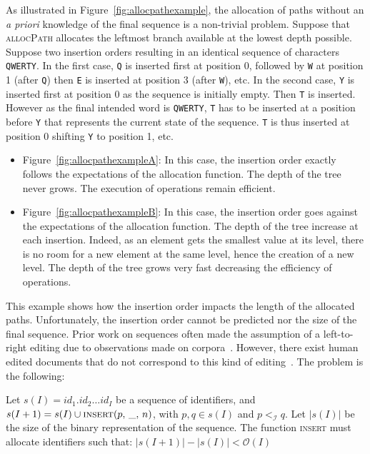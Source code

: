 As illustrated in Figure~\ref{fig:allocpathexample}, the allocation of paths
without an \emph{a priori} knowledge of the final sequence is a non-trivial
problem.  Suppose that \textsc{allocPath} allocates the leftmost branch
available at the lowest depth possible. Suppose two insertion orders resulting
in an identical sequence of characters \texttt{QWERTY}.  In the first case,
\texttt{Q} is inserted first at position 0, followed by \texttt{W} at position 1
(after \texttt{Q}) then \texttt{E} is inserted at position 3 (after \texttt{W}),
etc.  In the second case, \texttt{Y} is inserted first at position 0 as the
sequence is initially empty. Then \texttt{T} is inserted. However as the final
intended word is \texttt{QWERTY}, \texttt{T} has to be inserted at a position
before \texttt{Y} that represents the current state of the sequence. \texttt{T}
is thus inserted at position 0 shifting \texttt{Y} to position 1, etc.


\begin{itemize}
\item Figure~\ref{fig:allocpathexampleA}: In this case, the insertion order
  exactly follows the expectations of the allocation function. The depth of the
  tree never grows. The execution of operations remain efficient.

\item Figure~\ref{fig:allocpathexampleB}: In this case, the insertion order goes
  against the expectations of the allocation function. The depth of the tree
  increase at each insertion. Indeed, as an element gets the smallest value at
  its level, there is no room for a new element at the same level, hence the
  creation of a new level. The depth of the tree grows very fast decreasing the
  efficiency of operations.
\end{itemize}

This example shows how the insertion order impacts the length of the allocated
paths. Unfortunately, the insertion order cannot be predicted nor the size of
the final sequence. Prior work on sequences often made the assumption of a
left-to-right editing due to observations made on
corpora~\cite{preguica2009commutative, weiss2009logoot}. However, there exist
human edited documents that do not correspond to this kind of
editing~\cite{nedelec2013lseq}. The problem is the following:
\begin{problem}
  Let $s(I)= id_1.id_2\ldots id_I$ be a sequence of identifiers, and
  $s(I+1) = s(I) \cup \textsc{insert}(p,\, \_,\, n)$, with $p,q \in s(I)$ and
  $p<_\mathcal{I}q$. Let $|s(I)|$ be the size of the binary representation of
  the sequence. The function \textsc{insert} must allocate identifiers such
  that: \hspace{30pt} $|s(I+1)| - |s(I)| < \mathcal{O}(I)$ %
\end{problem}

